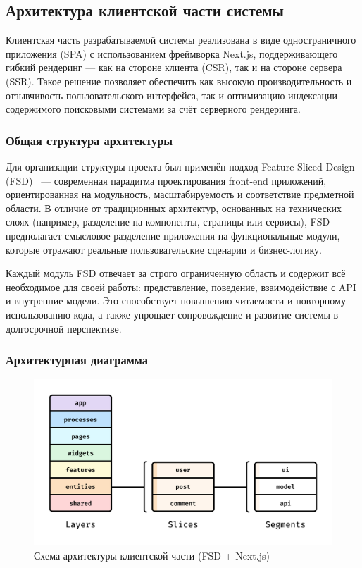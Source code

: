 \subsection{Архитектура клиентской части системы}

Клиентская часть разрабатываемой системы реализована в виде одностраничного приложения (SPA) с использованием фреймворка Next.js, поддерживающего гибкий рендеринг — как на стороне клиента (CSR), так и на стороне сервера (SSR). Такое решение позволяет обеспечить как высокую производительность и отзывчивость пользовательского интерфейса, так и оптимизацию индексации содержимого поисковыми системами за счёт серверного рендеринга.

\subsubsection{Общая структура архитектуры}

Для организации структуры проекта был применён подход Feature-Sliced Design (FSD)~\cite{feature_sliced_design} — современная парадигма проектирования front-end приложений, ориентированная на модульность, масштабируемость и соответствие предметной области. В отличие от традиционных архитектур, основанных на технических слоях (например, разделение на компоненты, страницы или сервисы), FSD предполагает смысловое разделение приложения на функциональные модули, которые отражают реальные пользовательские сценарии и бизнес-логику.

Каждый модуль FSD отвечает за строго ограниченную область и содержит всё необходимое для своей работы: представление, поведение, взаимодействие с API и внутренние модели. Это способствует повышению читаемости и повторному использованию кода, а также упрощает сопровождение и развитие системы в долгосрочной перспективе.

\subsubsection{Архитектурная диаграмма}

\begin{figure}[h]
  \centering
  \includegraphics[width=0.7\linewidth]{static/fsdImage}
  \caption{Схема архитектуры клиентской части (FSD + Next.js)}
\end{figure}


